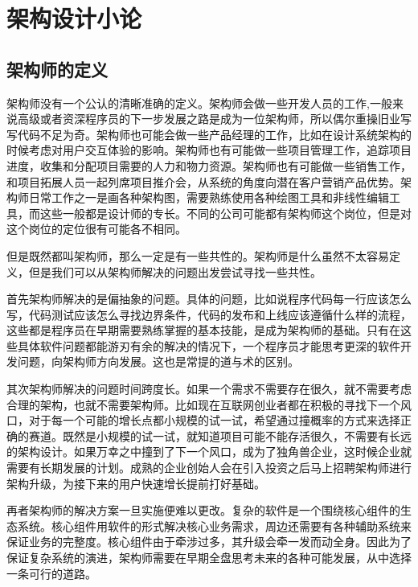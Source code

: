 \chapter{架构设计小论}


\section{架构师的定义}

架构师没有一个公认的清晰准确的定义。架构师会做一些开发人员的工作,一般来说高级或者资深程序员的下一步发展之路是成为一位架构师，所以偶尔重操旧业写写代码不足为奇。架构师也可能会做一些产品经理的工作，比如在设计系统架构的时候考虑对用户交互体验的影响。架构师也有可能做一些项目管理工作，追踪项目进度，收集和分配项目需要的人力和物力资源。架构师也有可能做一些销售工作，和项目拓展人员一起列席项目推介会，从系统的角度向潜在客户营销产品优势。架构师日常工作之一是画各种架构图，需要熟练使用各种绘图工具和非线性编辑工具，而这些一般都是设计师的专长。不同的公司可能都有架构师这个岗位，但是对这个岗位的定位很有可能各不相同。



但是既然都叫架构师，那么一定是有一些共性的。架构师是什么虽然不太容易定义，但是我们可以从架构师解决的问题出发尝试寻找一些共性。



首先架构师解决的是偏抽象的问题。具体的问题，比如说程序代码每一行应该怎么写，代码测试应该怎么寻找边界条件，代码的发布和上线应该遵循什么样的流程，这些都是程序员在早期需要熟练掌握的基本技能，是成为架构师的基础。只有在这些具体软件问题都能游刃有余的解决的情况下，一个程序员才能思考更深的软件开发问题，向架构师方向发展。这也是常提的道与术的区别。



其次架构师解决的问题时间跨度长。如果一个需求不需要存在很久，就不需要考虑合理的架构，也就不需要架构师。比如现在互联网创业者都在积极的寻找下一个风口，对于每一个可能的增长点都小规模的试一试，希望通过撞概率的方式来选择正确的赛道。既然是小规模的试一试，就知道项目可能不能存活很久，不需要有长远的架构设计。如果万幸之中撞到了下一个风口，成为了独角兽企业，这时候企业就需要有长期发展的计划。成熟的企业创始人会在引入投资之后马上招聘架构师进行架构升级，为接下来的用户快速增长提前打好基础。



再者架构师的解决方案一旦实施便难以更改。复杂的软件是一个围绕核心组件的生态系统。核心组件用软件的形式解决核心业务需求，周边还需要有各种辅助系统来保证业务的完整度。核心组件由于牵涉过多，其升级会牵一发而动全身。因此为了保证复杂系统的演进，架构师需要在早期全盘思考未来的各种可能发展，从中选择一条可行的道路。


